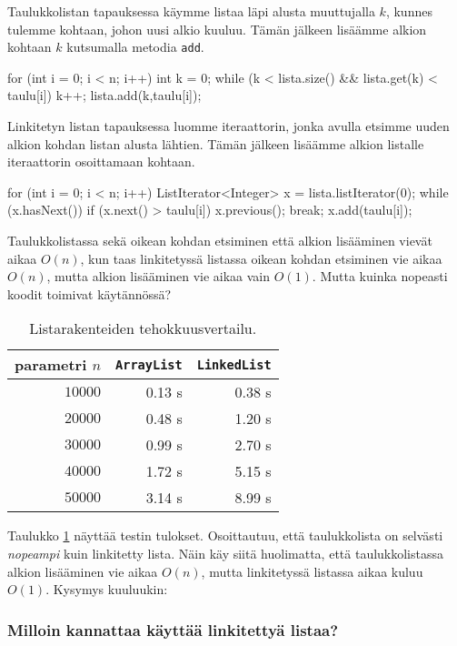 Taulukkolistan tapauksessa käymme listaa läpi alusta
muuttujalla $k$, kunnes tulemme kohtaan, johon uusi alkio kuuluu.
Tämän jälkeen lisäämme alkion kohtaan $k$ kutsumalla metodia \texttt{add}.

\begin{code}
for (int i = 0; i < n; i++) {
    int k = 0;
    while (k < lista.size() && lista.get(k) < taulu[i]) {
        k++;
    }
    lista.add(k,taulu[i]);
}
\end{code}

Linkitetyn listan tapauksessa luomme iteraattorin,
jonka avulla etsimme uuden alkion kohdan listan alusta lähtien.
Tämän jälkeen lisäämme alkion listalle iteraattorin osoittamaan kohtaan.

\begin{code}
for (int i = 0; i < n; i++) {
    ListIterator<Integer> x = lista.listIterator(0);
    while (x.hasNext()) {
        if (x.next() > taulu[i]) {
            x.previous();
            break;
        }
    }
    x.add(taulu[i]);
}
\end{code}

Taulukkolistassa sekä oikean kohdan etsiminen että alkion lisääminen
vievät aikaa $O(n)$, kun taas linkitetyssä listassa
oikean kohdan etsiminen vie aikaa $O(n)$, mutta alkion lisääminen
vie aikaa vain $O(1)$.
Mutta kuinka nopeasti koodit toimivat käytännössä?

\begin{table}
\center
\begin{tabular}{rrr}
parametri $n$ & \texttt{ArrayList} & \texttt{LinkedList} \\
\hline
$10000$ & 0.13 s & 0.38 s \\
$20000$ & 0.48 s & 1.20 s \\
$30000$ & 0.99 s & 2.70 s \\
$40000$ & 1.72 s & 5.15 s \\
$50000$ & 3.14 s & 8.99 s \\
\end{tabular}
\caption{Listarakenteiden tehokkuusvertailu.}
\label{tab:listes}
\end{table}

Taulukko \ref{tab:listes} näyttää testin tulokset.
Osoittautuu, että taulukkolista on selvästi
\emph{nopeampi} kuin linkitetty lista.
Näin käy siitä huolimatta, että taulukkolistassa
alkion lisääminen vie aikaa $O(n)$, mutta linkitetyssä
listassa aikaa kuluu $O(1)$.
Kysymys kuuluukin:

\subsubsection{Milloin kannattaa käyttää linkitettyä listaa?}

